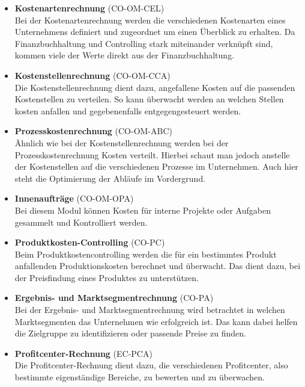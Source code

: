 \begin{itemize}
    \item \textbf{Kostenartenrechnung} (CO-OM-CEL)\\
    Bei der Kostenartenrechnung werden die verschiedenen Kostenarten eines Unternehmens definiert und zugeordnet um einen Überblick zu erhalten.
    Da Finanzbuchhaltung und Controlling stark miteinander verknüpft sind, kommen viele der Werte direkt aus der Finanzbuchhaltung. \cite{ControllingSAP} \cite{Kostenartenrechnung}

    \item \textbf{Kostenstellenrechnung} (CO-OM-CCA)\\
    Die Kostenstellenrechnung dient dazu, angefallene Kosten auf die passenden Kostenstellen zu verteilen. So kann überwacht werden an welchen Stellen kosten anfallen 
    und gegebenenfalls entgegengesteuert werden. \cite{ControllingSAP}

    \item \textbf{Prozesskostenrechnung} (CO-OM-ABC)\\
    Ähnlich wie bei der Kostenstellenrechnung werden bei der Prozesskostenrechnung Kosten verteilt. Hierbei schaut man jedoch anstelle der Kostenstellen auf die verschiedenen Prozesse im Unternehmen.
    Auch hier steht die Optimierung der Abläufe im Vordergrund. \cite{ControllingSAP}

    \item \textbf{Innenaufträge} (CO-OM-OPA)\\
    Bei diesem Modul können Kosten für interne Projekte oder Aufgaben gesammelt und Kontrolliert werden.\cite{ControllingSAP} \cite{Innenauftrag}

    \item \textbf{Produktkosten-Controlling} (CO-PC)\\
    Beim Produktkostencontrolling werden die für ein bestimmtes Produkt anfallenden Produktionskosten berechnet und überwacht. Das dient dazu,
     bei der Preisfindung eines Produktes zu unterstützen. \cite{ControllingSAP}

    \item \textbf{Ergebnis- und Marktsegmentrechnung} (CO-PA)\\
    Bei der Ergebnis- und Marktsegmentrechnung wird betrachtet in welchen Marktsegmenten das Unternehmen wie erfolgreich ist. Das kann dabei helfen
     die Zielgruppe zu identifizieren oder passende Preise zu finden. \cite{ControllingSAP}

    \item \textbf{Profitcenter-Rechnung} (EC-PCA)\\
    Die Profitcenter-Rechnung dient dazu, die verschiedenen Profitcenter, also bestimmte eigenständige Bereiche, zu bewerten und zu überwachen. \cite{ControllingSAP}

\end{itemize}

